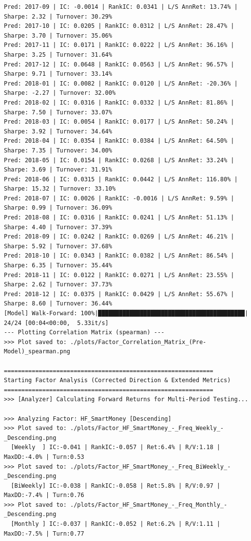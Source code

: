 \documentclass[10pt,compsoc,UTF8]{CjC}
\begin{document}
\begin{lstlisting}
Pred: 2017-09 | IC: -0.0014 | RankIC: 0.0341 | L/S AnnRet: 13.74% | Sharpe: 2.32 | Turnover: 30.29%  
Pred: 2017-10 | IC: 0.0205 | RankIC: 0.0312 | L/S AnnRet: 28.47% | Sharpe: 3.70 | Turnover: 35.06%   
Pred: 2017-11 | IC: 0.0171 | RankIC: 0.0222 | L/S AnnRet: 36.16% | Sharpe: 3.25 | Turnover: 31.64%   
Pred: 2017-12 | IC: 0.0648 | RankIC: 0.0563 | L/S AnnRet: 96.57% | Sharpe: 9.71 | Turnover: 33.14%   
Pred: 2018-01 | IC: 0.0082 | RankIC: 0.0120 | L/S AnnRet: -20.36% | Sharpe: -2.27 | Turnover: 32.00% 
Pred: 2018-02 | IC: 0.0316 | RankIC: 0.0332 | L/S AnnRet: 81.86% | Sharpe: 7.50 | Turnover: 33.07%   
Pred: 2018-03 | IC: 0.0054 | RankIC: 0.0177 | L/S AnnRet: 50.24% | Sharpe: 3.92 | Turnover: 34.64%   
Pred: 2018-04 | IC: 0.0354 | RankIC: 0.0384 | L/S AnnRet: 64.50% | Sharpe: 7.35 | Turnover: 34.00%   
Pred: 2018-05 | IC: 0.0154 | RankIC: 0.0268 | L/S AnnRet: 33.24% | Sharpe: 3.69 | Turnover: 31.91%   
Pred: 2018-06 | IC: 0.0315 | RankIC: 0.0442 | L/S AnnRet: 116.80% | Sharpe: 15.32 | Turnover: 33.10% 
Pred: 2018-07 | IC: 0.0026 | RankIC: -0.0016 | L/S AnnRet: 9.59% | Sharpe: 0.99 | Turnover: 36.09%   
Pred: 2018-08 | IC: 0.0316 | RankIC: 0.0241 | L/S AnnRet: 51.13% | Sharpe: 4.40 | Turnover: 37.39%   
Pred: 2018-09 | IC: 0.0242 | RankIC: 0.0269 | L/S AnnRet: 46.21% | Sharpe: 5.92 | Turnover: 37.68%   
Pred: 2018-10 | IC: 0.0343 | RankIC: 0.0382 | L/S AnnRet: 86.54% | Sharpe: 6.35 | Turnover: 35.44%   
Pred: 2018-11 | IC: 0.0122 | RankIC: 0.0271 | L/S AnnRet: 23.55% | Sharpe: 2.62 | Turnover: 37.73%   
Pred: 2018-12 | IC: 0.0375 | RankIC: 0.0429 | L/S AnnRet: 55.67% | Sharpe: 8.60 | Turnover: 36.44%   
[Model] Walk-Forward: 100%|██████████████████████████████████████████| 24/24 [00:04<00:00,  5.33it/s]
--- Plotting Correlation Matrix (spearman) ---
>>> Plot saved to: ./plots/Factor_Correlation_Matrix_(Pre-Model)_spearman.png

============================================================
Starting Factor Analysis (Corrected Direction & Extended Metrics)
============================================================
>>> [Analyzer] Calculating Forward Returns for Multi-Period Testing...

>>> Analyzing Factor: HF_SmartMoney [Descending]
>>> Plot saved to: ./plots/Factor_HF_SmartMoney_-_Freq_Weekly_-_Descending.png
  [Weekly  ] IC:-0.041 | RankIC:-0.057 | Ret:6.4% | R/V:1.18 | MaxDD:-4.0% | Turn:0.53
>>> Plot saved to: ./plots/Factor_HF_SmartMoney_-_Freq_BiWeekly_-_Descending.png
  [BiWeekly] IC:-0.038 | RankIC:-0.058 | Ret:5.8% | R/V:0.97 | MaxDD:-7.4% | Turn:0.76
>>> Plot saved to: ./plots/Factor_HF_SmartMoney_-_Freq_Monthly_-_Descending.png
  [Monthly ] IC:-0.037 | RankIC:-0.052 | Ret:6.2% | R/V:1.11 | MaxDD:-7.5% | Turn:0.77


\end{lstlisting}
\end{document}
